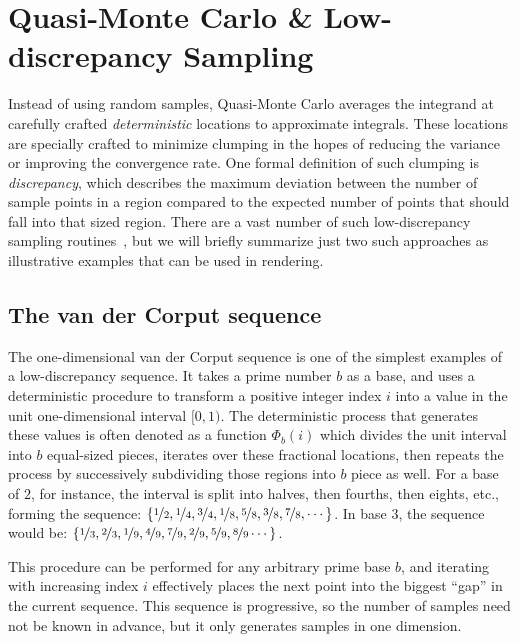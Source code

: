 \documentclass[11pt,fleqn]{book} %
\begin{document}
\section{Quasi-Monte Carlo \& Low-discrepancy Sampling}
Instead of using random samples, Quasi-Monte Carlo averages the integrand at carefully crafted \textit{deterministic} locations to approximate integrals. These locations are specially crafted to minimize clumping in the hopes of reducing the variance or improving the convergence rate. One formal definition of such clumping is \textit{discrepancy}, which describes the maximum deviation between the number of sample points in a region compared to the expected number of points that should fall into that sized region. There are a vast number of such low-discrepancy sampling routines~\cite{niederreiter1992quasi}, but we will briefly summarize just two such approaches as illustrative examples that can be used in rendering.


\subsection{The van der Corput sequence}
The one-dimensional van der Corput sequence is one of the simplest examples of a low-discrepancy sequence. It takes a prime number $b$ as a base, and uses a deterministic procedure to transform a positive integer index $i$ into a value in the unit one-dimensional interval $[0,1)$. The deterministic process that generates these values is often denoted as a function $\Phi_b(i)$ which divides the unit interval into $b$ equal-sized pieces, iterates over these fractional locations, then repeats the process by successively subdividing those regions into $b$ piece as well. For a base of $2$, for instance, the interval is split into halves, then fourths, then eights, etc., forming the sequence:
%
$\left\{\nicefrac{1}{2}, \nicefrac{1}{4}, \nicefrac{3}{4}, \nicefrac{1}{8}, \nicefrac{5}{8}, \nicefrac{3}{8}, \nicefrac{7}{8}, \cdots \right\}$.
%
In base $3$, the sequence would be:
%
$\left\{\nicefrac{1}{3}, \nicefrac{2}{3}, \nicefrac{1}{9}, \nicefrac{4}{9}, \nicefrac{7}{9}, \nicefrac{2}{9}, \nicefrac{5}{9}, \nicefrac{8}{9}\cdots \right\}$.
%

This procedure can be performed for any arbitrary prime base $b$, and iterating with increasing index $i$ effectively places the next point into the biggest ``gap'' in the current sequence. This sequence is progressive, so the number of samples need not be known in advance, but it only generates samples in one dimension.
\end{document}
